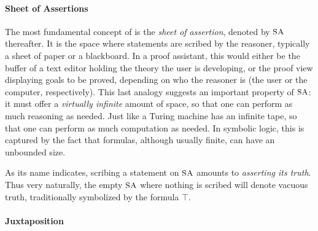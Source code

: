 \paragraph{Sheet of Assertions}

The most fundamental concept of  is the \emph{sheet of assertion},
denoted by $\small\textsc{SA}$ thereafter. It is the space where statements are scribed by the
reasoner, typically a sheet of paper or a blackboard. In a proof assistant, this
would either be the buffer of a text editor holding the theory the user is
developing, or the proof view displaying goals to be proved, depending on who
the reasoner is (the user or the computer, respectively). This last analogy
suggests an important property of $\small\textsc{SA}$: it must offer a \emph{virtually
infinite} amount of space, so that one can perform as much reasoning as needed.
Just like a Turing machine has an infinite tape, so that one can perform as much
computation as needed. In symbolic logic, this is captured by the fact that
formulas, although usually finite, can have an unbounded size.

As its name indicates, scribing a statement on $\small\textsc{SA}$ amounts to \emph{asserting
its truth}. Thus very naturally, the empty $\small\textsc{SA}$ where nothing is scribed will
denote vacuous truth, traditionally symbolized by the formula
$\top$.


\paragraph{Juxtaposition}

